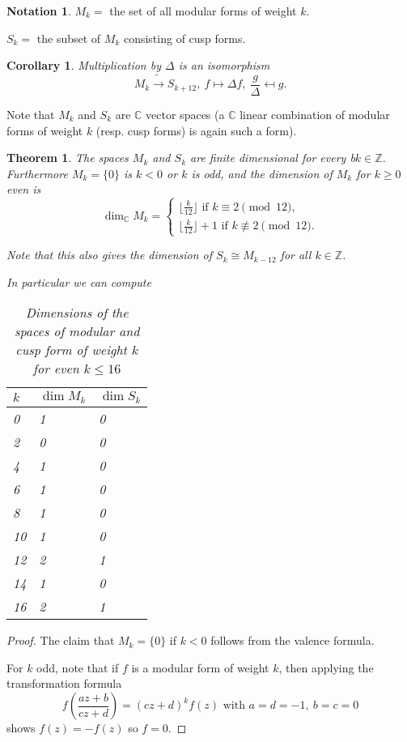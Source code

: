 \documentclass{article}
\newtheorem*{thm}{Theorem}
\newtheorem*{cor}{Corollary}
\theoremstyle{definition}
\newtheorem*{nota}{Notation}
\begin{document}
\begin{nota}
$M_k =$ the set of all modular forms of weight $k$.

$S_k =$ the subset of $M_k$ consisting of cusp forms.
\end{nota}

\begin{cor}
Multiplication by $\Delta$ is an isomorphism
\[M_k\tilde{\to}S_{k+12},\ f\mapsto \Delta f,\ \frac{g}{\Delta}\mapsfrom g.\]
\end{cor}

Note that $M_k$ and $S_k$ are $\mathbb{C}$ vector spaces (a $\mathbb{C}$ linear combination of modular forms of weight $k$ (resp. cusp forms) is again such a form).

\begin{thm}
The spaces $M_k$ and $S_k$ are finite dimensional for every b$k\in \mathbb{Z}$.
Furthermore $M_k=\{0\}$ is $k< 0$ or $k$ is odd, and the dimension of $M_k$ for $k\ge 0$ even is 
\[\dim_\mathbb{C} M_k =\begin{cases}
\lfloor\frac{k}{12}\rfloor\text{ if } k\equiv 2 \pmod{12}, \\
\lfloor\frac{k}{12}\rfloor+1\text{ if } k\not\equiv 2 \pmod{12}.
\end{cases}\]

Note that this also gives the dimension of $S_k\cong M_{k-12}$ for all $k\in\mathbb{Z}$.

In particular we can compute
\begin{table}[h]
\centering
\begin{tabular}{|l|l|l|}
\hline
$k$ & $\dim M_k$& $\dim S_k$\\
\hline
0 & 1 & 0 \\
2 & 0 & 0 \\
4 & 1 & 0 \\
6 & 1 & 0 \\
8 & 1 & 0 \\
10 & 1 & 0 \\
12 & 2 & 1 \\
14 & 1 & 0 \\
16 & 2 & 1 \\
\hline
\end{tabular}
\caption{\label{}Dimensions of the spaces of modular and cusp form of weight $k$ for even $k\le 16$}
\end{table}
\end{thm}

\begin{proof}
The claim that $M_k=\{0\}$ if $k< 0$ follows from the valence formula.

For $k$ odd, note that if $f$ is a modular form of weight $k$, then applying the transformation formula
\[f\left(\frac{az+b}{cz+d}\right) = (cz+d)^kf(z)\text{ with } a=d=-1,\ b=c=0\]
shows $f(z) = -f(z)$ so $f= 0$.


\end{proof}
\end{document}
